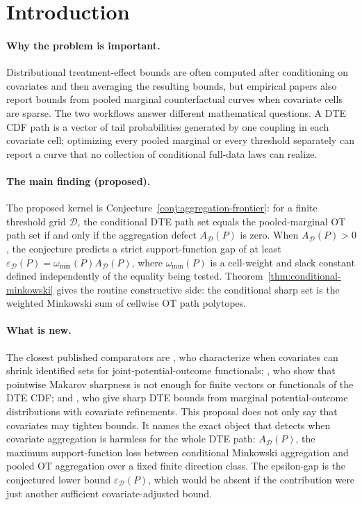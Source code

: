 \documentclass[11pt]{article}
\theoremstyle{definition}
\theoremstyle{plain}
\theoremstyle{remark}
\begin{document}
\section{Introduction}
\paragraph{Why the problem is important.}
Distributional treatment-effect bounds are often computed after conditioning on covariates and then averaging the resulting bounds, but empirical papers also report bounds from pooled marginal counterfactual curves when covariate cells are sparse.  The two workflows answer different mathematical questions.  A DTE CDF path is a vector of tail probabilities generated by one coupling in each covariate cell; optimizing every pooled marginal or every threshold separately can report a curve that no collection of conditional full-data laws can realize.

\paragraph{The main finding (proposed).}
The proposed kernel is Conjecture~\ref{conj:aggregation-frontier}: for a finite threshold grid \(\mathcal D\), the conditional DTE path set equals the pooled-marginal OT path set if and only if the aggregation defect \(A_{\mathcal D}(P)\) is zero.  When \(A_{\mathcal D}(P)>0\), the conjecture predicts a strict support-function gap of at least \(\varepsilon_{\mathcal D}(P)=\omega_{\min}(P)A_{\mathcal D}(P)\), where \(\omega_{\min}(P)\) is a cell-weight and slack constant defined independently of the equality being tested.  Theorem~\ref{thm:conditional-minkowski} gives the routine constructive side: the conditional sharp set is the weighted Minkowski sum of cellwise OT path polytopes.

\paragraph{What is new.}
The closest published comparators are \citet{FanGuerreZhu2017}, who characterize when covariates can shrink identified sets for joint-potential-outcome functionals; \citet{FirpoRidder2019}, who show that pointwise Makarov sharpness is not enough for finite vectors or functionals of the DTE CDF; and \citet{FanPark2010}, who give sharp DTE bounds from marginal potential-outcome distributions with covariate refinements.  This proposal does not only say that covariates may tighten bounds.  It names the exact object that detects when covariate aggregation is harmless for the whole DTE path: \(A_{\mathcal D}(P)\), the maximum support-function loss between conditional Minkowski aggregation and pooled OT aggregation over a fixed finite direction class.  The epsilon-gap is the conjectured lower bound \(\varepsilon_{\mathcal D}(P)\), which would be absent if the contribution were just another sufficient covariate-adjusted bound.
\end{document}
